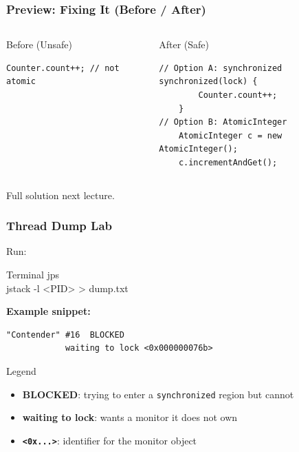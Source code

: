 \documentclass[aspectratio=169,11pt]{beamer}
\begin{document}
	\begin{frame}[fragile]
		\frametitle{Preview: Fixing It (Before / After)}
		\begin{columns}[T,onlytextwidth]
			\begin{block}{Before (Unsafe)}
\begin{lstlisting}
Counter.count++; // not atomic
\end{lstlisting}
			\end{block}
			
			\begin{block}{After (Safe)}
\begin{lstlisting}
// Option A: synchronized
synchronized(lock) {
		Counter.count++;
	}
// Option B: AtomicInteger
	AtomicInteger c = new AtomicInteger();
	c.incrementAndGet();
\end{lstlisting}
			\end{block}
		\end{columns}
		
		\vspace{1mm}
		\begin{center}
			\small Full solution next lecture.
		\end{center}
	\end{frame}
	
	\begin{frame}[fragile]
		\frametitle{Thread Dump Lab}
		Run:
		\begin{block}{Terminal}
			jps \\
			jstack -l <PID> > dump.txt
		\end{block}
		
		\vspace{1mm}
		\textbf{Example snippet:}
		\begin{lstlisting}[language={},basicstyle=\ttfamily\footnotesize]
			"Contender" #16  BLOCKED
			waiting to lock <0x000000076b>
		\end{lstlisting}
		
		\vspace{1mm}
		\begin{block}{Legend}
			\begin{itemize}
				\item \textbf{BLOCKED}: trying to enter a \texttt{synchronized} region but cannot
				\item \textbf{waiting to lock}: wants a monitor it does not own
				\item \textbf{\texttt{<0x...>}}: identifier for the monitor object
			\end{itemize}
		\end{block}
	\end{frame}
	
\end{document}
